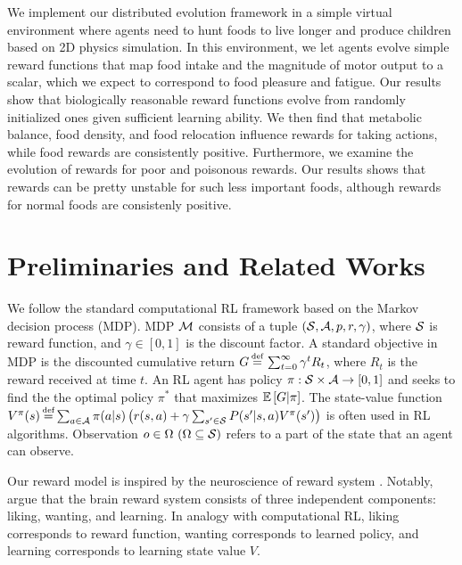 We implement our distributed evolution framework in a simple virtual environment where agents need to hunt foods to live longer and produce children based on 2D physics simulation. In this environment, we let agents evolve simple reward functions that map food intake and the magnitude of motor output to a scalar, which we expect to correspond to food pleasure and fatigue. Our results show that biologically reasonable reward functions evolve from randomly initialized ones given sufficient learning ability. We then find that metabolic balance, food density, and food relocation influence rewards for taking actions, while food rewards are consistently positive. Furthermore, we examine the evolution of rewards for poor and poisonous rewards. Our results shows that rewards can be pretty unstable for such less important foods, although rewards for normal foods are consistenly positive.

\section{Preliminaries and Related Works}\label{sec:related}
We follow the standard computational RL framework \citep{suttonReinforcementLearningIntroduction2018} based on the Markov decision process (MDP). MDP $\mathcal{M}{}$ consists of a tuple $(\mathcal{S}{}, \mathcal{A}{}, p, r, \gamma)$, where $\mathcal{S}{}$ is reward function, and $\gamma \in [0, 1]$ is the discount factor. A standard objective in MDP is the discounted cumulative return $G \defequal{} \sum_{t=0}^{\infty}\gamma^t R_{t}$, where $R_t$ is the reward received at time $t$. An RL agent has policy $\pi: \mathcal{S} \times \mathcal{A} \rightarrow [0, 1]$ and seeks to find the the optimal policy $\pi^{*}$ that maximizes $\mathbb{E} \left[G|\pi\right]$. The state-value function $V^\pi(s) \defequal \sum_{a \in \A} \pi(a|s) \left( r(s, a) + \gamma \sum_{s' \in \X} P(s'|s, a) V^\pi(s') \right)$ is often used in RL algorithms. Observation $o \in \Omega~(\Omega \subseteq \mathcal{S})$ refers to a part of the state that an agent can observe.

Our reward model is inspired by the neuroscience of reward system \citep{schultzNeuronalRewardDecision2015, berridgePleasureSystemsBrain2015}. Notably, \citet{berridgeDissectingComponentsReward2009} argue that the brain reward system consists of three independent components: liking, wanting, and learning. In analogy with computational RL, liking corresponds to reward function, wanting corresponds to learned policy, and learning corresponds to learning state value $V$.


